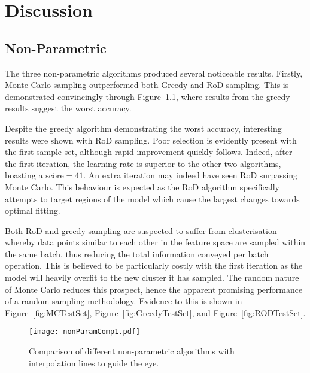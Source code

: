 \chapter{Discussion}


\graphicspath{{Chapter5/Figs/Vector/}{Chapter5/Figs/}}


\section{Non-Parametric}
The three non-parametric algorithms produced several noticeable results. Firstly, Monte Carlo sampling outperformed both Greedy and RoD sampling. This is demonstrated convincingly through Figure~\ref{fig:nPComp}, where results from the greedy results suggest the worst accuracy.

Despite the greedy algorithm demonstrating the worst accuracy, interesting results were shown with RoD sampling. Poor selection is evidently present with the first sample set, although rapid improvement quickly follows. Indeed, after the first iteration, the learning rate is superior to the other two algorithms, boasting a $\dot{\mathrm{score}}=41$. An extra iteration may indeed have seen RoD surpassing Monte Carlo. This behaviour is expected as the RoD algorithm specifically attempts to target regions of the model which cause the largest changes towards optimal fitting.

Both RoD and greedy sampling are suspected to suffer from clusterisation whereby data points similar to each other in the feature space are sampled within the same batch, thus reducing the total information conveyed per batch operation. This is believed to be particularly costly with the first iteration as the model will heavily overfit to the new cluster it has sampled. The random nature of Monte Carlo reduces this prospect, hence the apparent promising performance of a random sampling methodology. Evidence to this is shown in Figure~\ref{fig:MCTestSet}, Figure~\ref{fig:GreedyTestSet}, and Figure~\ref{fig:RODTestSet}.

\begin{figure}[H]
    \begin{center}
        \texttt{[image: nonParamComp1.pdf]}
        \caption[Non-Parametric Comparison]{Comparison of different non-parametric algorithms with interpolation lines to guide the eye.}
        \label{fig:nPComp}
    \end{center}
\end{figure}

